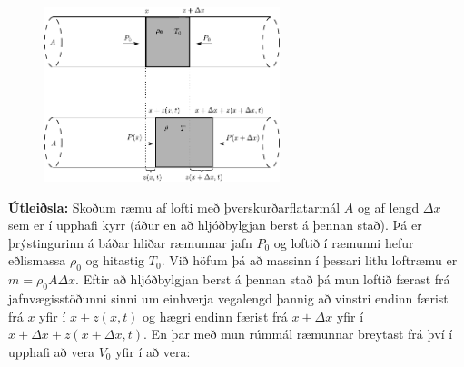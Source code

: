 \ifdefined \wholebook \else\documentclass[oneside]{book}\usepackage{EdlBook}\graphicspath{{figures/}}
\begin{document}
\begin{minipage}{\linewidth}

\begin{figure}
\vspace{-0.5cm}
\includegraphics[width=2.7in]{figures/loft-pipa.pdf}
\end{figure}

\textbf{Útleiðsla:} Skoðum ræmu af lofti með þverskurðarflatarmál $A$ og af lengd $\Delta x$ sem er í upphafi kyrr (áður en að hljóðbylgjan berst á þennan stað). Þá er þrýstingurinn á báðar hliðar ræmunnar jafn $P_0$ og loftið í ræmunni hefur eðlismassa $\rho_0$ og hitastig $T_0$. Við höfum þá að massinn í þessari litlu loftræmu er $m = \rho_0 A \Delta x$. Eftir að hljóðbylgjan berst á þennan stað þá mun loftið færast frá jafnvægisstöðunni sinni um einhverja vegalengd þannig að vinstri endinn færist frá $x$ yfir í $x + z(x,t)$ og hægri endinn færist frá $x + \Delta x$ yfir í $x + \Delta x + z(x+\Delta x, t)$. En þar með mun rúmmál ræmunnar breytast frá því í upphafi að vera $V_0$ yfir í að vera:
\end{minipage}
\end{document}
